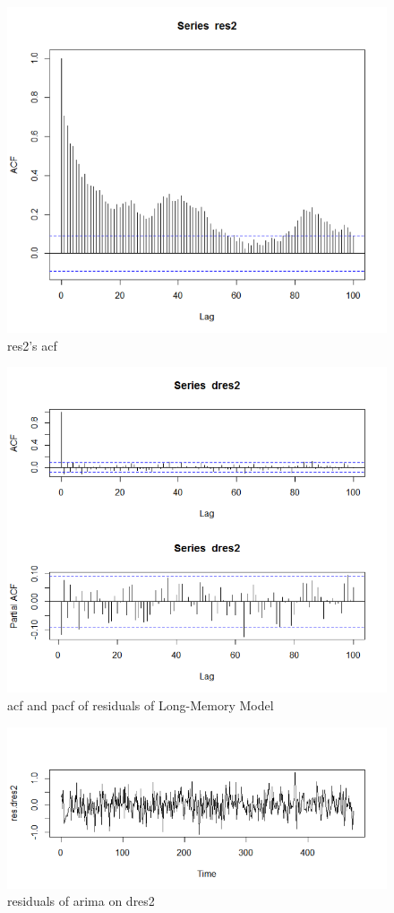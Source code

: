 \documentclass[a4paper,11pt]{article}
\begin{document}
\begin{figure}[H]
\centering
\caption{res2's acf}
\includegraphics[scale=.80]{Picture5.png}
\end{figure}

\begin{figure}[H]
\centering
\caption{acf and pacf of residuals of Long-Memory Model}
\includegraphics[scale=.80]{Picture6.png}
\end{figure}

\begin{figure}[H]
\centering
\caption{residuals of arima on dres2}
\includegraphics[scale=.80]{Picture7.png}
\end{figure}
\end{document}
